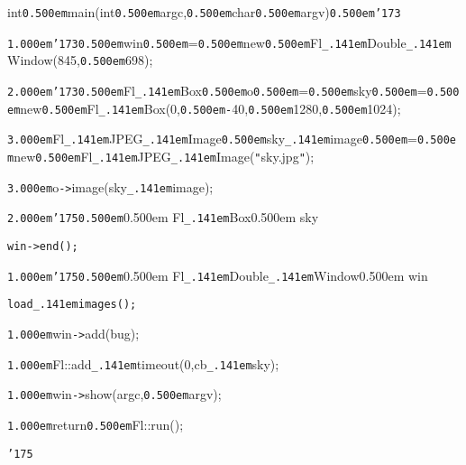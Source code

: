 \documentclass[12pt]{article}
\begin{document}
\noindent
{}\hfill

\noindent
{}int{\tt\mc \kern0.500em}main(int{\tt\mc \kern0.500em}argc,{\tt\mc \kern0.500em}char{\tt\mc \kern0.500em}{\tt *}{\tt *}argv){\tt\mc \kern0.500em}{\tt\char'173}

\noindent
{}{\tt\mc \kern1.000em}{\tt\char'173}{\tt\mc \kern0.500em}win{\tt\mc \kern0.500em}={\tt\mc \kern0.500em}new{\tt\mc \kern0.500em}Fl{\tt\_\kern.141em}Double{\tt\_\kern.141em}Window(845,{\tt\mc \kern0.500em}698);

\noindent
{}{\tt\mc \kern2.000em}{\tt\char'173}{\tt\mc \kern0.500em}Fl{\tt\_\kern.141em}Box{\tt *}{\tt\mc \kern0.500em}o{\tt\mc \kern0.500em}={\tt\mc \kern0.500em}sky{\tt\mc \kern0.500em}={\tt\mc \kern0.500em}new{\tt\mc \kern0.500em}Fl{\tt\_\kern.141em}Box(0,{\tt\mc \kern0.500em}{\tt -}40,{\tt\mc \kern0.500em}1280,{\tt\mc \kern0.500em}1024);

\noindent
{}{\tt\mc \kern3.000em}Fl{\tt\_\kern.141em}JPEG{\tt\_\kern.141em}Image{\tt *}{\tt\mc \kern0.500em}sky{\tt\_\kern.141em}image{\tt\mc \kern0.500em}={\tt\mc \kern0.500em}new{\tt\mc \kern0.500em}Fl{\tt\_\kern.141em}JPEG{\tt\_\kern.141em}Image({\tt "}sky.jpg{\tt "});

\noindent
{}{\tt\mc \kern3.000em}o{\tt -}{\tt >}image(sky{\tt\_\kern.141em}image);

\noindent
{}{\tt\mc \kern2.000em}{\tt\char'175}{\tt\mc \kern0.500em}\rm\mc {\tt /}{\tt /}\kern0.500em Fl{\tt\_\kern.141em}Box{\tt *}\kern0.500em sky

\noindent
\tt\mc {\tt\mc \kern2.000em}win{\tt -}{\tt >}end();

\noindent
{}{\tt\mc \kern1.000em}{\tt\char'175}{\tt\mc \kern0.500em}\rm\mc {\tt /}{\tt /}\kern0.500em Fl{\tt\_\kern.141em}Double{\tt\_\kern.141em}Window{\tt *}\kern0.500em win

\noindent
\tt\mc {\tt\mc \kern1.000em}load{\tt\_\kern.141em}images();

\noindent
{}{\tt\mc \kern1.000em}win{\tt -}{\tt >}add(bug);

\noindent
{}{\tt\mc \kern1.000em}Fl::add{\tt\_\kern.141em}timeout(0,cb{\tt\_\kern.141em}sky);

\noindent
{}{\tt\mc \kern1.000em}win{\tt -}{\tt >}show(argc,{\tt\mc \kern0.500em}argv);

\noindent
{}{\tt\mc \kern1.000em}return{\tt\mc \kern0.500em}Fl::run();

\noindent
{}{\tt\char'175}

\noindent
{}

\rm\mc
\end{document}
